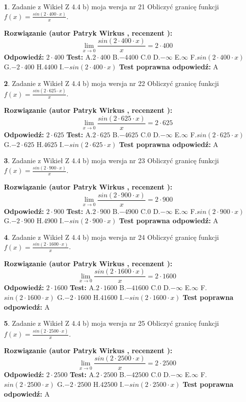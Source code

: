 \documentclass[12pt, a4paper]{article}
\theoremstyle{definition} %
\newtheorem{zad}{}
\newcommand{\zadStart}[1]{\begin{zad}#1\newline}
\newcommand{\zadStop}{\end{zad}}
\newcommand{\rozwStart}[2]{\noindent \textbf{Rozwiązanie (autor #1 , recenzent #2): }\newline}
\newcommand{\rozwStop}{\newline}
\newcommand{\odpStart}{\noindent \textbf{Odpowiedź:}\newline}
\newcommand{\odpStop}{\newline}
\newcommand{\testStart}{\noindent \textbf{Test:}\newline}
\newcommand{\testStop}{\newline}
\newcommand{\kluczStart}{\noindent \textbf{Test poprawna odpowiedź:}\newline}
\newcommand{\kluczStop}{\newline}
\begin{document}
\zadStart{Zadanie z Wikieł Z 4.4 b) moja wersja nr 21}
Obliczyć granicę funkcji $f(x)=\frac{sin(2 \cdot400\cdot x)}{x}$.
\zadStop
\rozwStart{Patryk Wirkus}{}
$$\lim\limits_{x\to 0}\frac{sin(2 \cdot 400\cdot x)}{x}=
2 \cdot 400$$
\rozwStop
\odpStart
$2 \cdot 400$
\odpStop
\testStart
A.$2 \cdot 400$
B.$-4400$
C.$0$
D.$-\infty$
E.$\infty$
F.$sin(2 \cdot 400\cdot x)$
G.$-2 \cdot 400$
H.$4400$
I.$-sin(2 \cdot 400\cdot x)$
\testStop
\kluczStart
A
\kluczStop



\zadStart{Zadanie z Wikieł Z 4.4 b) moja wersja nr 22}
Obliczyć granicę funkcji $f(x)=\frac{sin(2 \cdot625\cdot x)}{x}$.
\zadStop
\rozwStart{Patryk Wirkus}{}
$$\lim\limits_{x\to 0}\frac{sin(2 \cdot 625\cdot x)}{x}=
2 \cdot 625$$
\rozwStop
\odpStart
$2 \cdot 625$
\odpStop
\testStart
A.$2 \cdot 625$
B.$-4625$
C.$0$
D.$-\infty$
E.$\infty$
F.$sin(2 \cdot 625\cdot x)$
G.$-2 \cdot 625$
H.$4625$
I.$-sin(2 \cdot 625\cdot x)$
\testStop
\kluczStart
A
\kluczStop



\zadStart{Zadanie z Wikieł Z 4.4 b) moja wersja nr 23}
Obliczyć granicę funkcji $f(x)=\frac{sin(2 \cdot900\cdot x)}{x}$.
\zadStop
\rozwStart{Patryk Wirkus}{}
$$\lim\limits_{x\to 0}\frac{sin(2 \cdot 900\cdot x)}{x}=
2 \cdot 900$$
\rozwStop
\odpStart
$2 \cdot 900$
\odpStop
\testStart
A.$2 \cdot 900$
B.$-4900$
C.$0$
D.$-\infty$
E.$\infty$
F.$sin(2 \cdot 900\cdot x)$
G.$-2 \cdot 900$
H.$4900$
I.$-sin(2 \cdot 900\cdot x)$
\testStop
\kluczStart
A
\kluczStop



\zadStart{Zadanie z Wikieł Z 4.4 b) moja wersja nr 24}
Obliczyć granicę funkcji $f(x)=\frac{sin(2 \cdot1600\cdot x)}{x}$.
\zadStop
\rozwStart{Patryk Wirkus}{}
$$\lim\limits_{x\to 0}\frac{sin(2 \cdot 1600\cdot x)}{x}=
2 \cdot 1600$$
\rozwStop
\odpStart
$2 \cdot 1600$
\odpStop
\testStart
A.$2 \cdot 1600$
B.$-41600$
C.$0$
D.$-\infty$
E.$\infty$
F.$sin(2 \cdot 1600\cdot x)$
G.$-2 \cdot 1600$
H.$41600$
I.$-sin(2 \cdot 1600\cdot x)$
\testStop
\kluczStart
A
\kluczStop



\zadStart{Zadanie z Wikieł Z 4.4 b) moja wersja nr 25}
Obliczyć granicę funkcji $f(x)=\frac{sin(2 \cdot2500\cdot x)}{x}$.
\zadStop
\rozwStart{Patryk Wirkus}{}
$$\lim\limits_{x\to 0}\frac{sin(2 \cdot 2500\cdot x)}{x}=
2 \cdot 2500$$
\rozwStop
\odpStart
$2 \cdot 2500$
\odpStop
\testStart
A.$2 \cdot 2500$
B.$-42500$
C.$0$
D.$-\infty$
E.$\infty$
F.$sin(2 \cdot 2500\cdot x)$
G.$-2 \cdot 2500$
H.$42500$
I.$-sin(2 \cdot 2500\cdot x)$
\testStop
\kluczStart
A
\kluczStop
\end{document}

